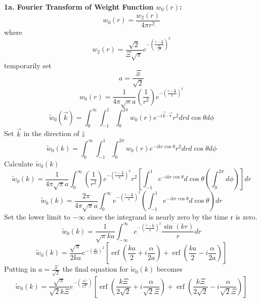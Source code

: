 \documentclass[12pt]{article}
\begin{document}
\textbf{1a. Fourier Transform of Weight Function $w_0(r)$:}
\begin{equation}{w_0(r)=\frac{w_2(r)}{4{\pi}r^2}}\end{equation}
where
\begin{equation}{w_2(r)=\frac{\sqrt{2}}{\Xi\sqrt{\pi}}e^{-\left(\frac{r-\frac{\alpha}{2}}{\frac{\Xi}{\sqrt{2}}}\right)^2}}\end{equation}
temporarily set 
\begin{equation}{a=\frac{\Xi}{\sqrt{2}}}\end{equation}
\begin{equation}{w_0(r)=\frac{1}{4{\pi}\sqrt{\pi}a}\left(\frac{1}{r^2}\right)e^{-\left(\frac{r-\frac{\alpha}{2}}{a}\right)^2}}\end{equation}
\begin{equation}{\widetilde{w}_0(\vec{k})=\int_{0}^{\infty}\int_{-1}^{1}\int_{0}^{2\pi}w_0(r)e^{-i\vec{k}\cdot{\vec{r}}}r^2d{r}d{\cos\theta}d{\phi}}\end{equation}
Set $\vec{k}$ in the direction of $\hat{z}$ 
\begin{equation}{\widetilde{w}_0(k)=\int_{0}^{\infty}\int_{-1}^{1}\int_{0}^{2\pi}w_0(r)e^{-ikr\cos\theta}r^2d{r}d{\cos\theta}d{\phi}}\end{equation}
\[{}\]
Calculate $\widetilde{w}_0(k)$ 
\begin{equation}{\widetilde{w}_0(k)=\frac{1}{4{\pi}\sqrt{\pi}a}\int_{0}^{\infty}\left(\frac{1}{r^2}\right)e^{-\left(\frac{r-\frac{\alpha}{2}}{a}\right)^2}r^2\left[\int_{-1}^{1}e^{-ikr\cos\theta}d{\cos\theta}\left(\int_{0}^{2\pi}d{\phi}\right)\right]d{r}}\end{equation}
\[{}\]
\begin{equation}{\widetilde{w}_0(k)=\frac{2\pi}{4{\pi}\sqrt{\pi}a}\int_{0}^{\infty}e^{-\left(\frac{r-\frac{\alpha}{2}}{a}\right)^2}\left(\int_{-1}^{1}e^{-ikr\cos\theta}d{\cos\theta}\right)d{r}}\end{equation}
\[{}\]
Set the lower limit to $-\infty$  since the integrand is nearly zero by the time r is zero. 
\begin{equation}{\widetilde{w}_0(k)=\frac{1}{\sqrt{\pi}ka}\int_{-\infty}^{\infty}e^{-\left(\frac{r-\frac{\alpha}{2}}{a}\right)^2}\frac{\sin(kr)}{r}d{r}}\end{equation}
\[{}\]
\begin{equation}{\widetilde{w}_0(k)=\frac{\sqrt{\pi}}{2ka}e^{-\left(\frac{\alpha}{2a}\right)^2}\left[\operatorname{erf}\left(\frac{ka}{2}+i\frac{\alpha}{2a}\right)+\operatorname{erf}\left(\frac{ka}{2}-i\frac{\alpha}{2a}\right)\right]}\end{equation}
\[{}\] 
Putting in $a=\frac{\Xi}{\sqrt{2}}$ the final equation for $\widetilde{w}_0(k)$ becomes
\begin{equation}{\widetilde{w}_0(k)=\frac{\sqrt{\pi}}{\sqrt{2}k\Xi}e^{-\left(\frac{\alpha^2}{2\Xi^2}\right)}\left[\operatorname{erf}\left(\frac{k\Xi}{2\sqrt{2}}+i\frac{\alpha}{\sqrt{2}\Xi}\right)+\operatorname{erf}\left(\frac{k\Xi}{2\sqrt{2}}-i\frac{\alpha}{\sqrt{2}\Xi}\right)\right]}\end{equation}
\end{document}
